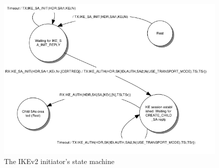 \documentclass[final,a4paper,twoside,11pt,onecolumn]{report}
\begin{document}
\begin{figure}[h]
   \includegraphics[width=1.0\textwidth]{fsm/initiator_mealy}
   \caption{The IKEv2 initiator's state machine}
   \label{fig:initiator-machine}
\end{figure}
\end{document}

